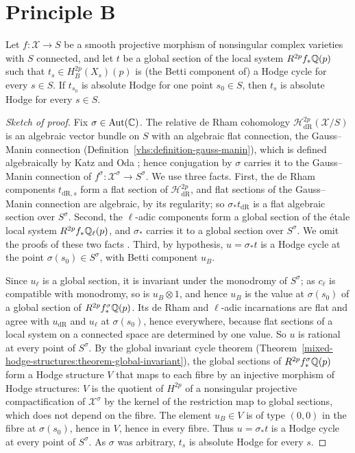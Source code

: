 \section{Principle B}\label{absolute-hodge:section-principle-b}

\begin{theorem}\label{absolute-hodge:theorem-principle-b}
Let $f \colon \mathcal{X} \to S$ be a smooth projective morphism of nonsingular complex varieties with $S$ connected, and let $t$ be a global section of the local system $R^{2p}f_*\mathbb{Q}(p)$ such that
$t_s \in H^{2p}_B(X_s)(p)$ is (the Betti component of) a Hodge cycle for every $s \in S$. If $t_{s_0}$ is absolute Hodge for one point $s_0 \in S$, then $t_s$ is absolute Hodge for every $s \in S$.
\end{theorem}

\begin{proof}[Sketch of proof]
Fix $\sigma \in \mathrm{Aut}(\mathbb{C})$. The relative de Rham cohomology $\mathcal{H}^{2p}_{\mathrm{dR}}(\mathcal{X}/S)$ is an algebraic vector bundle on $S$ with an algebraic flat connection, the Gauss--Manin connection
(Definition~\ref{vhs:definition-gauss-manin}), which is defined algebraically by Katz and Oda \cite{katz-oda-1968}; hence conjugation by $\sigma$ carries it to the Gauss--Manin connection of
$f^\sigma \colon \mathcal{X}^\sigma \to S^\sigma$. We use three facts. First, the de Rham components $t_{\mathrm{dR},s}$ form a flat section of $\mathcal{H}^{2p}_{\mathrm{dR}}$, and flat sections of the Gauss--Manin
connection are algebraic, by its regularity; so $\sigma_*t_{\mathrm{dR}}$ is a flat algebraic section over $S^\sigma$. Second, the $\ell$-adic components form a global section of the \'etale local system
$R^{2p}f_*\mathbb{Q}_\ell(p)$, and $\sigma_*$ carries it to a global section over $S^\sigma$. We omit the proofs of these two facts \cite{deligne-abelian}. Third, by hypothesis, $u = \sigma_*t$ is a Hodge cycle at the point
$\sigma(s_0) \in S^\sigma$, with Betti component $u_B$.

Since $u_\ell$ is a global section, it is invariant under the monodromy of $S^\sigma$; as $c_\ell$ is compatible with monodromy, so is $u_B \otimes 1$, and hence $u_B$ is the value at $\sigma(s_0)$ of a global section
of $R^{2p}f^\sigma_*\mathbb{Q}(p)$. Its de Rham and $\ell$-adic incarnations are flat and agree with $u_{\mathrm{dR}}$ and $u_\ell$ at $\sigma(s_0)$, hence everywhere, because flat sections of a local system on a
connected space are determined by one value. So $u$ is rational at every point of $S^\sigma$. By the global invariant cycle theorem (Theorem~\ref{mixed-hodge-structures:theorem-global-invariant}), the global sections
of $R^{2p}f^\sigma_*\mathbb{Q}(p)$ form a Hodge structure $V$ that maps to each fibre by an injective morphism of Hodge structures: $V$ is the quotient of $H^{2p}$ of a nonsingular projective compactification of
$\mathcal{X}^\sigma$ by the kernel of the restriction map to global sections, which does not depend on the fibre. The element $u_B \in V$ is of type $(0,0)$ in the fibre at $\sigma(s_0)$, hence in $V$, hence in
every fibre. Thus $u = \sigma_*t$ is a Hodge cycle at every point of $S^\sigma$. As $\sigma$ was arbitrary, $t_s$ is absolute Hodge for every $s$.
\end{proof}


